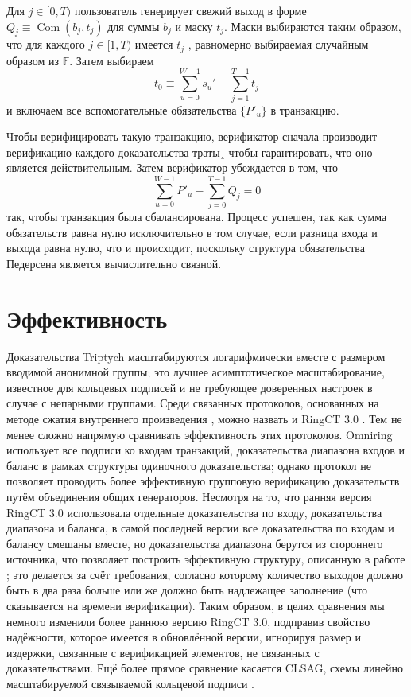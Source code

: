 \documentclass{article}
\newcommand{\F}{\mathbb{F}}
\newcommand{\com}{\operatorname{Com}}
\theoremstyle{definition}
\begin{document}
Для $j \in [0,T)$ пользователь генерирует свежий выход в форме $Q_j \equiv \com(b_j,t_j)$ для суммы $b_j$ и маску $t_j$.
Маски выбираются таким образом, что для каждого $j \in [1,T)$ имеется $t_j$ , равномерно выбираемая случайным образом из $\F$.
Затем выбираем $$t_0 \equiv \sum_{u=0}^{W-1} s_u' -\sum_{j=1}^{T-1} t_j$$ и включаем все вспомогательные обязательства $\{P'_u\}$ в транзакцию.

Чтобы верифицировать такую транзакцию, верификатор сначала производит верификацию каждого доказательства траты¸ чтобы гарантировать, что оно является действительным. Затем верификатор убеждается в том, что $$\sum_{u=0}^{W-1} P'_u - \sum_{j=0}^{T-1} Q_j = 0$$ так, чтобы транзакция была сбалансирована.
Процесс успешен, так как сумма обязательств равна нулю исключительно в том случае, если разница входа и выхода равна нулю, что и происходит, поскольку структура обязательства Педерсена является вычислительно связной.


\section{Эффективность}
Доказательства Triptych масштабируются логарифмически вместе с размером вводимой анонимной группы; это лучшее асимптотическое масштабирование, известное для кольцевых подписей и не требующее доверенных настроек в случае с непарными группами.
Среди связанных протоколов, основанных на методе сжатия внутреннего произведения \cite{bulletproofs}, можно назвать \cite{omniring} и RingCT 3.0 \cite{omniring}.
Тем не менее сложно напрямую сравнивать эффективность этих протоколов.
Omniring использует все подписи ко входам транзакций, доказательства диапазона входов и баланс в рамках структуры одиночного доказательства; однако протокол не позволяет проводить более эффективную групповую верификацию доказательств путём объединения общих генераторов.
Несмотря на то, что ранняя версия RingCT 3.0 использовала отдельные доказательства по входу, доказательства диапазона и баланса, в самой последней версии все доказательства по входам и балансу смешаны вместе, но доказательства диапазона берутся из стороннего источника, что позволяет построить эффективную структуру, описанную в работе \cite{bulletproofs}; это делается за счёт требования, согласно которому количество выходов должно быть в два раза больше или же должно быть надлежащее заполнение (что сказывается на времени верификации). Таким образом, в целях сравнения мы немного изменили более раннюю версию RingCT 3.0, подправив свойство надёжности, которое имеется в обновлённой версии, игнорируя размер и издержки, связанные с верификацией элементов, не связанных с доказательствами.
Ещё более прямое сравнение касается CLSAG, схемы линейно масштабируемой связываемой кольцевой подписи \cite{clsag}.
\end{document}
